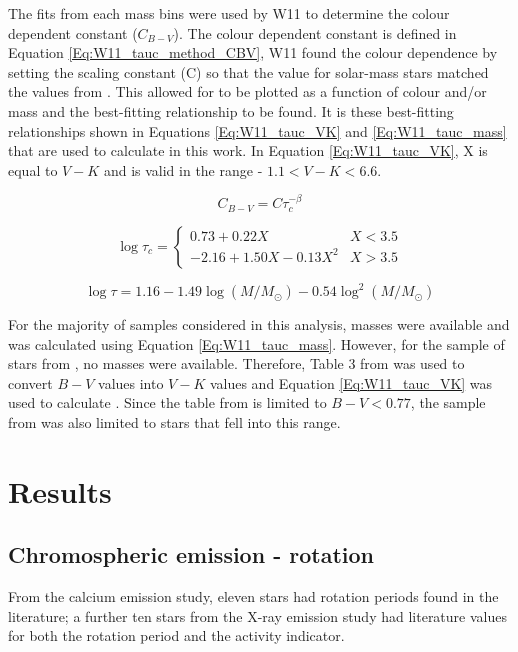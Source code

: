 The fits from each mass bins were used by W11 to determine the colour dependent constant ($C_{B-V}$). The colour dependent constant is defined in Equation \ref{Eq:W11_tauc_method_CBV}, W11 found the colour dependence by setting the scaling constant (C) so that the \tauc value for solar-mass stars matched the values from \citet{Noyes_etal_1984}. This allowed for \tauc to be plotted as a function of colour and/or mass and the best-fitting relationship to be found. It is these best-fitting relationships shown in Equations \ref{Eq:W11_tauc_VK} and \ref{Eq:W11_tauc_mass} that are used to calculate \tauc in this work. In Equation \ref{Eq:W11_tauc_VK}, X is equal to $V-K$ and is valid in the range - $1.1 < V-K < 6.6$.

\begin{equation}
    C_{B-V} = C\tau_{c}^{-\beta}
    \label{Eq:W11_tauc_method_CBV}
\end{equation}

\begin{equation}
    \log \tau_{c} = 
    \begin{cases}
        0.73 + 0.22X & X < 3.5 \\
        -2.16 +1.50X - 0.13X^{2} & X > 3.5
    \end{cases}
    \label{Eq:W11_tauc_VK}
\end{equation}

\begin{equation}
    \log \tau = 1.16 - 1.49\log(M/M_{\odot}) - 0.54\log^{2}(M/M_{\odot})
    \label{Eq:W11_tauc_mass}
\end{equation}

For the majority of samples considered in this analysis, masses were available and \tauc was calculated using Equation \ref{Eq:W11_tauc_mass}. However, for the sample of stars from \citet{Baliunas_etal_1996}, no masses were available. Therefore, Table 3 from \citet{Pecaut_etal_2012} was used to convert $B-V$ values into $V-K$ values and Equation \ref{Eq:W11_tauc_VK} was used to calculate \tauc. Since the table from \citet{Pecaut_etal_2012} is limited to $B-V < 0.77$, the sample from \citet{Baliunas_etal_1996} was also limited to stars that fell into this range.

\section{Results}

\subsection{Chromospheric emission - rotation}
From the calcium emission study, eleven stars had rotation periods found in the literature; a further ten stars from the X-ray emission study had literature values for both the rotation period and the \Rprime activity indicator. 


